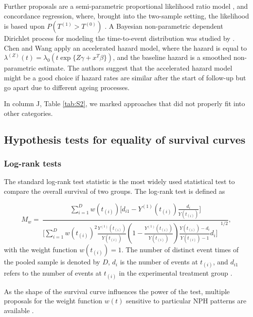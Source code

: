 \noindent Further proposals are a semi-parametric proportional likelihood ratio model \cite{Zhu.2014},  and concordance regression, where, brought into the two-sample setting, the likelihood is based upon $P(T^{(1)}>T^{(0)})$ \cite{Dunkler.2010}. A Bayesian non-parametric dependent Dirichlet process for modeling the time-to-event distribution was studied by \cite{Iorio.2009}. Chen and Wang \cite{Chen.2010} apply an accelerated hazard model, where the hazard is equal to $\lambda^{(Z)}(t) = \lambda_0(t \exp\{Z \gamma + x^T\beta\})$, and the baseline hazard is a smoothed non-parametric estimate. The authors suggest that the accelerated hazard model might be a good choice if hazard rates are similar after the start of follow-up but go apart due to different ageing processes. 

\noindent In column J, Table \ref{tab:S2}, we marked approaches that did not properly fit into other categories.


\newpage
\subsection{Hypothesis tests for equality of survival curves}\label{suppl.test}
\subsubsection{Log-rank tests} \label{logrank}

\noindent 

\noindent The standard log-rank test statistic \cite{Peto.1972, Mantel.1966} is the most widely used statistical test to compare the overall survival of two groups. The log-rank test is defined as  

\noindent 
\[M_w=\ \frac{\sum_{i=1}^{D}{w(t_{(i)})\big[d_{i1}-Y^{(1)}(t_{(i)})\frac{d_i}{Y(t_{(i)})}\big]}}{{\big[\sum_{i=1}^D {w(t_{(i)})^2 \frac{Y^{(1)}(t_{(i)})}{Y(t_{(i)})}(1-\frac{Y^{(1)}(t_{(i)})}{Y(t_{(i)})})\frac{Y(t_{(i)})-d_i}{Y(t_{(i)})-1}d_i\big]\ \ }}^{1/2}},\] 
with the weight function $w(t_{(i)})=1$.
The number of distinct event times of the pooled sample is denoted by $D$, $d_{i}$ is the number of events at $t_{(i)}$, and $d_{i1}$ refers to the number of events at $t_{(i)}$ in the experimental treatment group \cite{Klein.2003}.

\noindent As the shape of the survival curve influences the power of the test, multiple proposals for the weight function $w(t)$ sensitive to particular NPH patterns are available \cite{Royston.2020}.

